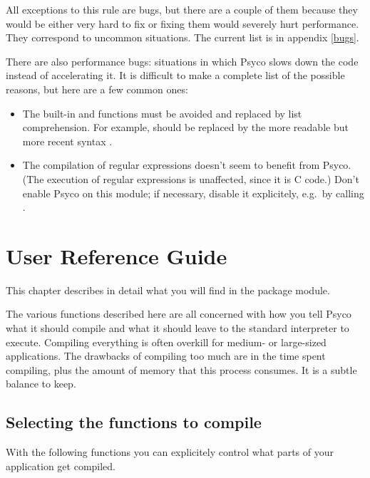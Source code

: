 \documentclass{manual}
\begin{document}
All exceptions to this rule are bugs, but there are a couple of them because they would be either very hard to fix or fixing them would severely hurt performance.  They correspond to uncommon situations.  The current list is in appendix \ref{bugs}.

There are also performance bugs: situations in which Psyco slows down the code instead of accelerating it.  It is difficult to make a complete list of the possible reasons, but here are a few common ones:

\begin{itemize}
\item The built-in  and  functions must be avoided and replaced by list comprehension.  For example,  should be replaced by the more readable but more recent syntax .
\item The compilation of regular expressions doesn't seem to benefit from Psyco.  (The execution of regular expressions is unaffected, since it is C code.)  Don't enable Psyco on this module; if necessary, disable it explicitely, e.g.\ by calling .
\end{itemize}



\chapter{User Reference Guide}


This chapter describes in detail what you will find in the  package module.

The various functions described here are all concerned with how you tell Psyco what it should compile and what it should leave to the standard interpreter to execute.  Compiling everything is often overkill for medium- or large-sized applications.  The drawbacks of compiling too much are in the time spent compiling, plus the amount of memory that this process consumes.  It is a subtle balance to keep.


\section{Selecting the functions to compile}

With the following functions you can explicitely control what parts of your application get compiled.
\end{document}

